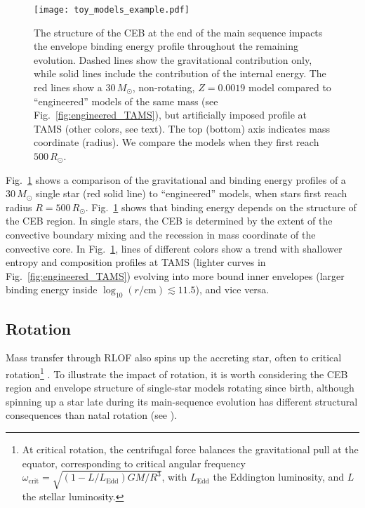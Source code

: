 \documentclass[twocolumn,twocolappendix,trackchanges]{aastex63}
\DeclareRobustCommand{\Figref}[1]{Fig.~\ref{#1}}
\begin{document}
\begin{figure}[htbp]
  \centering
  \texttt{[image: toy\_models\_example.pdf]}
  \caption{The structure of the CEB at the end of the main sequence
    impacts the envelope binding energy profile throughout the
    remaining evolution. Dashed lines show the gravitational
    contribution only, while solid lines include the contribution of
    the internal energy. The red lines show a $30\,M_\odot$,
    non-rotating, $Z=0.0019$ model compared to ``engineered'' models
    of the same mass (see \Figref{fig:engineered_TAMS}), but
    artificially imposed profile at TAMS (other colors, see text). The
    top (bottom) axis indicates mass coordinate (radius). We compare
    the models when they first reach $500\,R_\odot$.}
  \label{fig:toy_models_example}
\end{figure}


\Figref{fig:toy_models_example} shows a comparison of the
gravitational and binding energy profiles of a $30\,M_\odot$ single
star (red solid line) to
``engineered'' models, when stars first
reach radius $R=500\,R_\odot$.
\Figref{fig:toy_models_example} shows that
binding energy depends on the structure of the CEB region. In single
stars, the CEB is determined by the extent of the convective boundary
mixing and the recession in mass coordinate of the
convective core. In \Figref{fig:toy_models_example}, lines of
different colors show a trend with shallower entropy and composition
profiles at TAMS (lighter curves in \Figref{fig:engineered_TAMS})
evolving into more bound inner envelopes (larger
binding energy inside $\log_{10}(r/\mathrm{cm})\lesssim 11.5$), and
vice versa.

\subsection{Rotation}
\label{sec:rot_examples}

Mass transfer through RLOF also spins up the accreting star, often to
critical rotation\footnote{At critical rotation, the centrifugal force
  balances the gravitational pull at the equator, corresponding to
  critical angular frequency
  $\omega_\mathrm{crit}=\sqrt{(1-L/L_\mathrm{Edd})GM/R^3}$, with
  $L_\mathrm{Edd}$ the Eddington luminosity, and $L$ the stellar
  luminosity.} \citep[e.g.,][]{lubow:1975, packet:1981,
  cantiello:2007}. To illustrate the
  impact of rotation, it is worth considering the CEB
 region and envelope structure
 of single-star models rotating since
birth, although spinning up a star late during its
main-sequence evolution has different structural consequences than
natal rotation (see \citealt{renzo:2021zoph}).
\end{document}
